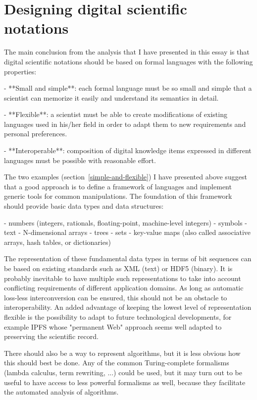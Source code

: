 \section{Designing digital scientific notations}
\label{design-guidelines}

The main conclusion from the analysis that I have presented in this essay is that digital scientific notations should be based on formal languages with the following properties:

 - **Small and simple**: each formal language must be so small and simple that a scientist can memorize it easily and understand its semantics in detail.

 - **Flexible**: a scientist must be able to create modifications of existing languages used in his/her field in order to adapt them to new requirements and personal preferences.

 - **Interoperable**: composition of digital knowledge items expressed in different languages must be possible with reasonable effort.

The two examples (section~\ref{simple-and-flexible}) I have presented above suggest that a good approach is to define a framework of languages and implement generic tools for common manipulations. The foundation of this framework should provide basic data types and data structures:

 - numbers (integers, rationals, floating-point, machine-level integers)
 - symbols
 - text
 - N-dimensional arrays
 - trees
 - sets
 - key-value maps (also called associative arrays, hash tables, or dictionaries)

The representation of these fundamental data types in terms of bit sequences can be based on existing standards such as XML (text) or HDF5 (binary). It is probably inevitable to have multiple such representations to take into account conflicting requirements of different application domains. As long as automatic loss-less interconversion can be ensured, this should not be an obstacle to interoperability. An added advantage of keeping the lowest level of representation flexible is the possibility to adapt to future technological developments, for example IPFS \cite{benet_ipfs_2014} whose "permanent Web" approach seems well adapted to preserving the scientific record.

There should also be a way to represent algorithms, but it is less obvious how this should best be done. Any of the common Turing-complete formalisms (lambda calculus, term rewriting, ...) could be used, but it may turn out to be useful to have access to less powerful formalisms as well, because they facilitate the automated analysis of algorithms.


